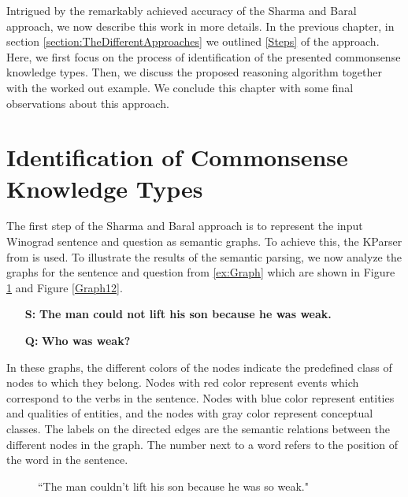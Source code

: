 
Intrigued by the remarkably achieved accuracy of the Sharma and Baral \cite{2018CommonsenseKT} approach, we now describe this work in more details. In the previous chapter, in section \ref{section:TheDifferentApproaches} we outlined \ref{Steps} of the approach. Here, we first focus on the process of identification of the presented commonsense knowledge types. Then, we discuss the proposed reasoning algorithm together with the worked out example. We conclude this chapter with some final observations about this approach.


\section{Identification of Commonsense Knowledge Types}
The first step of the Sharma and Baral \cite{2018CommonsenseKT} approach is to represent the input Winograd sentence and question as semantic graphs. To achieve this, the KParser from \cite{DBLP:conf/ijcai/SharmaVAB15} is used. 
To illustrate the results of the semantic parsing, we now analyze the graphs for the sentence and question from \ref{ex:Graph} which are shown in Figure \ref{Graph11} and Figure \ref{Graph12}. \\ 
\begin{itemize}
	\item[\textbf{S:}] \textbf{The man could not lift his son because he was weak.}
	\item[\textbf{Q:}] \textbf{Who was weak?}
\end{itemize}

In these graphs, the different colors of the nodes indicate the predefined class of nodes to which they belong. 
Nodes with red color represent events which correspond to the verbs in the sentence. Nodes with blue color represent entities and qualities of entities, and the nodes with gray color represent conceptual classes. The labels on the directed edges are the semantic relations between the different nodes in the graph. The number next to a word refers to the position of the word in the sentence. 
\begin{figure}
	\centering
	
	\caption{\label{Graph11}``The man couldn't lift his son because he was so weak."}
\end{figure}



